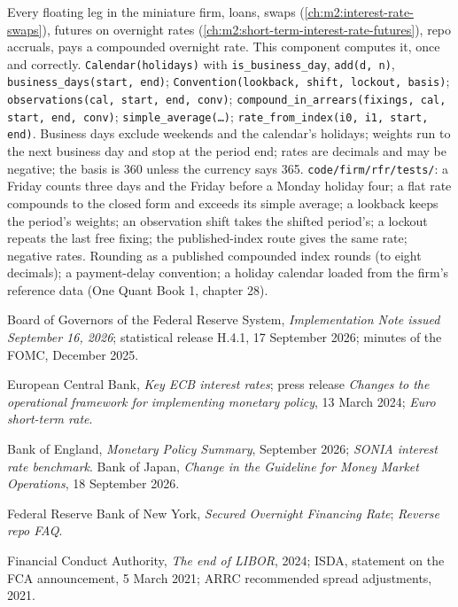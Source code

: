 \begin{build}
 Every floating leg in the miniature firm, loans, swaps
(\cref{ch:m2:interest-rate-swaps}), futures on overnight rates
(\cref{ch:m2:short-term-interest-rate-futures}), repo accruals, pays a
compounded overnight rate. This component computes it, once and correctly.
 \texttt{Calendar(holidays)} with \texttt{is\_business\_day},
\texttt{add(d, n)}, \texttt{business\_days(start, end)};
\texttt{Convention(lookback, shift, lockout, basis)};
\texttt{observations(cal, start, end, conv)};
\texttt{compound\_in\_arrears(fixings, cal, start, end, conv)};
\texttt{simple\_average(\ldots)}; \texttt{rate\_from\_index(i0, i1, start,
end)}.
 Business days exclude weekends and the calendar's holidays;
weights run to the next business day and stop at the period end; rates are
decimals and may be negative; the basis is 360 unless the currency says 365.
 \texttt{code/firm/rfr/tests/}: a Friday counts three
days and the Friday before a Monday holiday four; a flat rate compounds to
the closed form and exceeds its simple average; a lookback keeps the
period's weights; an observation shift takes the shifted period's; a lockout
repeats the last free fixing; the published-index route gives the same rate;
negative rates.
 Rounding as a published compounded index rounds (to eight
decimals); a payment-delay convention; a holiday calendar loaded from the
firm's reference data (One Quant Book 1, chapter 28).
\end{build}

\begin{omsources}
\item Board of Governors of the Federal Reserve System, \emph{Implementation
Note issued September 16, 2026}; statistical release H.4.1, 17 September
2026; minutes of the FOMC, December 2025.
\item European Central Bank, \emph{Key ECB interest rates}; press release
\emph{Changes to the operational framework for implementing monetary
policy}, 13 March 2024; \emph{Euro short-term rate}.
\item Bank of England, \emph{Monetary Policy Summary}, September 2026;
\emph{SONIA interest rate benchmark}. Bank of Japan, \emph{Change in the
Guideline for Money Market Operations}, 18 September 2026.
\item Federal Reserve Bank of New York, \emph{Secured Overnight Financing
Rate}; \emph{Reverse repo FAQ}.
\item Financial Conduct Authority, \emph{The end of LIBOR}, 2024; ISDA,
statement on the FCA announcement, 5 March 2021; ARRC recommended spread
adjustments, 2021.
\end{omsources}

